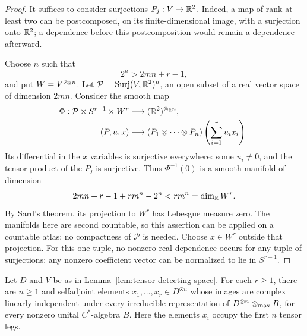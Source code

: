 \begin{proof}
It suffices to consider surjections \(P_j:V\to\mathbb R^2\).
Indeed, a map of rank at least two can be postcomposed, on its
finite-dimensional image, with a surjection onto \(\mathbb R^2\); a dependence
before this postcomposition would remain a dependence afterward.

Choose \(n\) such that
\[
                         2^n>2mn+r-1,
\]
and put \(W=V^{\otimes_{\mathbb R}n}\). Let
\(\mathcal P=\operatorname{Surj}(V,\mathbb R^2)^n\), an open subset of a real
vector space of dimension \(2mn\). Consider the smooth map
\[
 \begin{split}
 \Phi:\mathcal P\times S^{r-1}\times W^r
     &\longrightarrow (\mathbb R^2)^{\otimes_{\mathbb R}n},\\
 (P,u,x)&\longmapsto
 (P_1\otimes\cdots\otimes P_n)\left(\sum_{i=1}^r u_i x_i\right).
 \end{split}
\]
Its differential in the \(x\) variables is surjective everywhere:
some \(u_i\ne0\), and the tensor product of the \(P_j\) is surjective.
Thus \(\Phi^{-1}(0)\) is a smooth manifold of dimension
\[
                 2mn+r-1+rm^n-2^n<rm^n=\dim_{\mathbb R}W^r.
\]
By Sard's theorem, its projection to \(W^r\) has Lebesgue measure zero.
The manifolds here are second countable, so this assertion can be
applied on a countable atlas; no compactness of \(\mathcal P\) is needed.
Choose \(x\in W^r\) outside that projection. For this one tuple, no
nonzero real dependence occurs for any tuple of surjections: any
nonzero coefficient vector can be normalized to lie in \(S^{r-1}\).
\end{proof}

\begin{corollary}
\label{cor:tensor-represented-labels}
Let \(D\) and \(V\) be as in Lemma~\ref{lem:tensor-detecting-space}.
For each \(r\ge1\), there are \(n\ge1\) and selfadjoint elements
\(x_1,\ldots,x_r\in D^{\otimes n}\) whose images are complex linearly
independent under every irreducible representation of
\(D^{\otimes n}\otimes_{\max} B\), for every nonzero unital \(C^*\)-algebra \(B\).
Here the elements \(x_i\) occupy the first \(n\) tensor legs.
\end{corollary}

